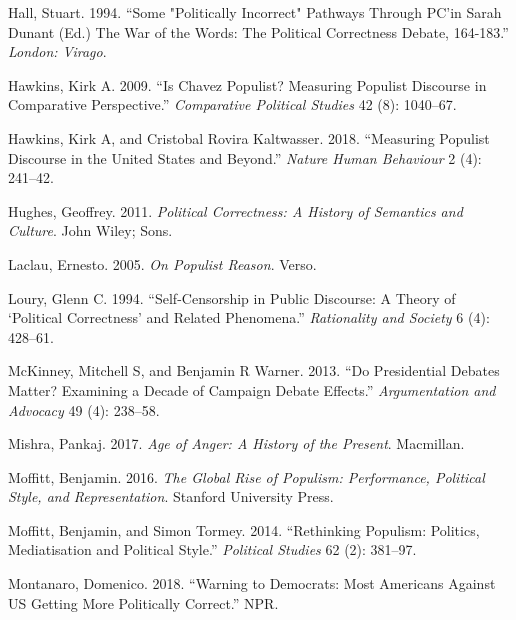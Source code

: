 \documentclass[
  12pt,
]{article}
\newlength{\cslhangindent}
\newlength{\cslentryspacingunit} %
\newenvironment{CSLReferences}[2] %
 {%
  \setlength{\parindent}{0pt}
  \ifodd #1
  \let\oldpar\par
  \def\par{\hangindent=\cslhangindent\oldpar}
  \fi
  \setlength{\parskip}{#2\cslentryspacingunit}
 }%
 {}
\begin{document}
\begin{CSLReferences}{1}{0}
\leavevmode{}%
Hall, Stuart. 1994. {``Some "Politically Incorrect" Pathways Through
PC'in Sarah Dunant (Ed.) The War of the Words: The Political Correctness
Debate, 164-183.''} \emph{London: Virago}.

\leavevmode{}%
Hawkins, Kirk A. 2009. {``Is Chavez Populist? Measuring Populist
Discourse in Comparative Perspective.''} \emph{Comparative Political
Studies} 42 (8): 1040--67.

\leavevmode{}%
Hawkins, Kirk A, and Cristobal Rovira Kaltwasser. 2018. {``Measuring
Populist Discourse in the United States and Beyond.''} \emph{Nature
Human Behaviour} 2 (4): 241--42.

\leavevmode{}%
Hughes, Geoffrey. 2011. \emph{Political Correctness: A History of
Semantics and Culture}. John Wiley; Sons.

\leavevmode{}%
Laclau, Ernesto. 2005. \emph{On Populist Reason}. Verso.

\leavevmode{}%
Loury, Glenn C. 1994. {``Self-Censorship in Public Discourse: A Theory
of {`Political Correctness'} and Related Phenomena.''} \emph{Rationality
and Society} 6 (4): 428--61.

\leavevmode{}%
McKinney, Mitchell S, and Benjamin R Warner. 2013. {``Do Presidential
Debates Matter? Examining a Decade of Campaign Debate Effects.''}
\emph{Argumentation and Advocacy} 49 (4): 238--58.

\leavevmode{}%
Mishra, Pankaj. 2017. \emph{Age of Anger: A History of the Present}.
Macmillan.

\leavevmode{}%
Moffitt, Benjamin. 2016. \emph{The Global Rise of Populism: Performance,
Political Style, and Representation}. Stanford University Press.

\leavevmode{}%
Moffitt, Benjamin, and Simon Tormey. 2014. {``Rethinking Populism:
Politics, Mediatisation and Political Style.''} \emph{Political Studies}
62 (2): 381--97.

\leavevmode{}%
Montanaro, Domenico. 2018. {``Warning to Democrats: Most Americans
Against US Getting More Politically Correct.''} NPR.


\end{CSLReferences}
\end{document}
